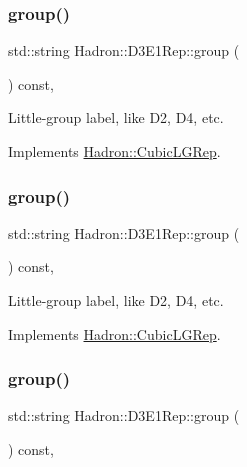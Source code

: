 \subsubsection{\texorpdfstring{group()}{group()}\hspace{0.1cm}{\footnotesize\ttfamily [3/5]}}
{\footnotesize\ttfamily std\+::string Hadron\+::\+D3\+E1\+Rep\+::group (\begin{DoxyParamCaption}{ }\end{DoxyParamCaption}) const\hspace{0.3cm}{\ttfamily [inline]}, {\ttfamily [virtual]}}

Little-\/group label, like D2, D4, etc. 

Implements \mbox{\hyperlink{structHadron_1_1CubicLGRep_a9bdb14b519a611d21379ed96a3a9eb41}{Hadron\+::\+Cubic\+L\+G\+Rep}}.

\mbox{\label{structHadron_1_1D3E1Rep_abb8515fbdd1dceea33a5f4af036f31eb}} 
\subsubsection{\texorpdfstring{group()}{group()}\hspace{0.1cm}{\footnotesize\ttfamily [4/5]}}
{\footnotesize\ttfamily std\+::string Hadron\+::\+D3\+E1\+Rep\+::group (\begin{DoxyParamCaption}{ }\end{DoxyParamCaption}) const\hspace{0.3cm}{\ttfamily [inline]}, {\ttfamily [virtual]}}

Little-\/group label, like D2, D4, etc. 

Implements \mbox{\hyperlink{structHadron_1_1CubicLGRep_a9bdb14b519a611d21379ed96a3a9eb41}{Hadron\+::\+Cubic\+L\+G\+Rep}}.

\mbox{\label{structHadron_1_1D3E1Rep_abb8515fbdd1dceea33a5f4af036f31eb}} 
\subsubsection{\texorpdfstring{group()}{group()}\hspace{0.1cm}{\footnotesize\ttfamily [5/5]}}
{\footnotesize\ttfamily std\+::string Hadron\+::\+D3\+E1\+Rep\+::group (\begin{DoxyParamCaption}{ }\end{DoxyParamCaption}) const\hspace{0.3cm}{\ttfamily [inline]}, {\ttfamily [virtual]}}

